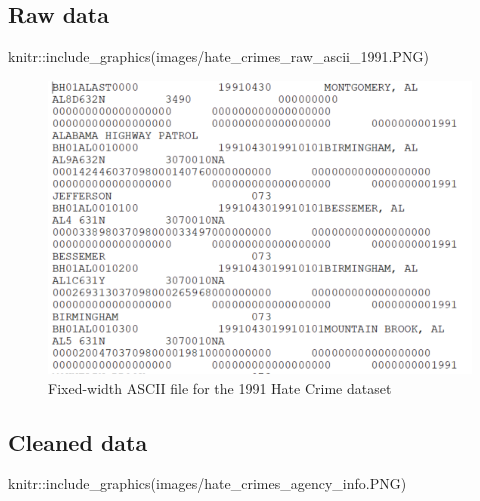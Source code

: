 \documentclass[
  12pt,
  openany]{book}
\newenvironment{Shaded}{\begin{snugshade}}{\end{snugshade}}
\newcommand{\FunctionTok}[1]{\textcolor[rgb]{0,0,0}{#1}}
\newcommand{\NormalTok}[1]{#1}
\newcommand{\SpecialCharTok}[1]{\textcolor[rgb]{0,0,0}{#1}}
\newcommand{\StringTok}[1]{\textcolor[rgb]{0.5,0.5,0.5}{#1}}
\begin{document}
\hypertarget{raw-data-4}{%
\subsection{Raw data}\label{raw-data-4}}

\begin{Shaded}
\begin{Highlighting}[]
\NormalTok{knitr}\SpecialCharTok{::}\FunctionTok{include\_graphics}\NormalTok{(}\StringTok{\textquotesingle{}images/hate\_crimes\_raw\_ascii\_1991.PNG\textquotesingle{}}\NormalTok{)}
\end{Highlighting}
\end{Shaded}

\begin{figure}
\includegraphics[width=7.79in]{images/hate_crimes_raw_ascii_1991} \caption{Fixed-width ASCII file for the 1991 Hate Crime dataset}\label{fig:unnamed-chunk-1}
\end{figure}

\hypertarget{cleaned-data-4}{%
\subsection{Cleaned data}\label{cleaned-data-4}}

\begin{Shaded}
\begin{Highlighting}[]
\NormalTok{knitr}\SpecialCharTok{::}\FunctionTok{include\_graphics}\NormalTok{(}\StringTok{\textquotesingle{}images/hate\_crimes\_agency\_info.PNG\textquotesingle{}}\NormalTok{)}
\end{Highlighting}
\end{Shaded}
\end{document}
